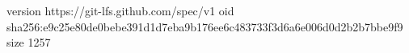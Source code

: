 version https://git-lfs.github.com/spec/v1
oid sha256:e9c25e80de0bebe391d1d7eba9b176ee6c483733f3d6a6e006d0d2b2b7bbe9f9
size 1257
